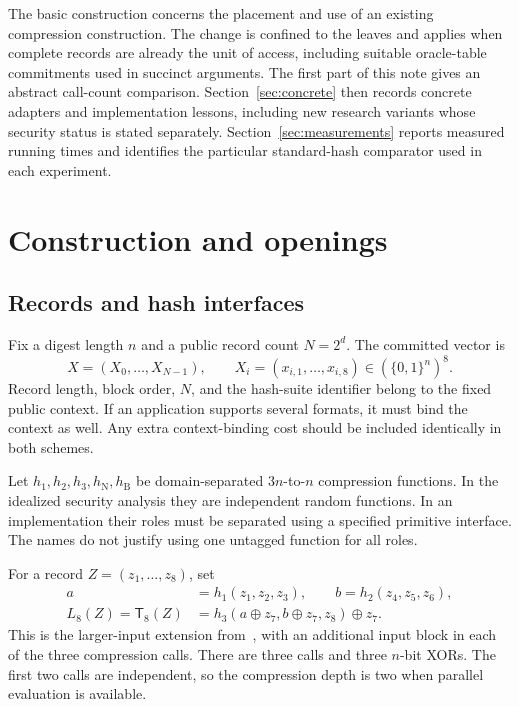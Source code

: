 \documentclass[11pt,letterpaper]{article}
\theoremstyle{definition} %
\newcommand{\Tate}{\mathsf{T}_{8}}
\begin{document}
The basic construction concerns the placement and use of an existing
compression construction. The change is confined to the leaves and applies
when complete records are already the unit of access, including suitable
oracle-table commitments used in succinct arguments. The first part of this
note gives an abstract call-count comparison. Section~\ref{sec:concrete}
then records concrete adapters and implementation lessons, including new
research variants whose security status is stated separately.
Section~\ref{sec:measurements} reports measured running times and identifies
the particular standard-hash comparator used in each experiment.

\section{Construction and openings}
\label{sec:construction}
\subsection{Records and hash interfaces}
Fix a digest length $n$ and a public record count $N=2^d$. The committed
vector is
\[
 X=(X_0,\ldots,X_{N-1}),\qquad
 X_i=(x_{i,1},\ldots,x_{i,8})\in(\{0,1\}^n)^8.
\]
Record length, block order, $N$, and the hash-suite identifier belong to the
fixed public context. If an application supports several formats, it must
bind the context as well. Any extra context-binding cost should be included
identically in both schemes.

Let $h_1,h_2,h_3,h_{\mathrm N},h_{\mathrm B}$ be domain-separated
$3n$-to-$n$ compression functions. In the idealized security analysis they
are independent random functions. In an implementation their roles must be
separated using a specified primitive interface. The names do not justify
using one untagged function for all roles.

For a record $Z=(z_1,\ldots,z_8)$, set
\begin{equation}
\begin{aligned}
 a&=h_1(z_1,z_2,z_3),\qquad b=h_2(z_4,z_5,z_6),\\
 L_8(Z)=\Tate(Z)&=h_3(a\oplus z_7,b\oplus z_7,z_8)\oplus z_7.
\end{aligned}
\label{eq:t8}
\end{equation}
This is the larger-input extension from~\cite[Section~6]{DKMN21}, with an
additional input block in each of the three compression calls. There are
three calls and three $n$-bit XORs. The first two calls are independent, so
the compression depth is two when parallel evaluation is available.
\end{document}
